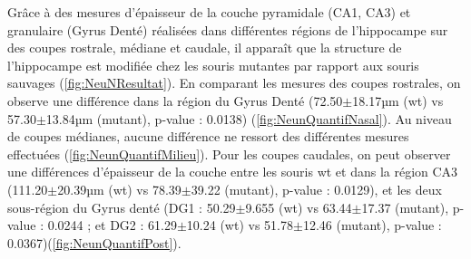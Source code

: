 		Grâce à des mesures d'épaisseur de la couche pyramidale (CA1, CA3) et granulaire (Gyrus Denté) réalisées dans différentes régions de l'hippocampe sur des coupes rostrale, médiane et caudale, il apparaît que la structure de l'hippocampe est modifiée chez les souris mutantes par rapport aux souris sauvages (\cref{fig:NeuNResultat}). En comparant les mesures des coupes rostrales, on observe une différence dans la région du Gyrus Denté (72.50$\pm$18.17µm (\acrshort{wt}) vs 57.30$\pm$13.84µm (mutant), p-value : 0.0138) (\cref{fig:NeunQuantifNasal}).  Au niveau de coupes médianes, aucune différence ne ressort des différentes mesures effectuées (\cref{fig:NeunQuantifMilieu}). Pour les coupes caudales, on peut observer une différences d'épaisseur de la couche entre les souris \gls{wt} et \mcrd dans la région CA3 (111.20$\pm$20.39µm (\acrshort{wt}) vs 78.39$\pm$39.22 (mutant), p-value : 0.0129), et les deux sous-région du Gyrus denté (DG1 : 50.29$\pm$9.655 (\acrshort{wt}) vs 63.44$\pm$17.37 (mutant), p-value : 0.0244 ; et DG2 : 61.29$\pm$10.24 (\acrshort{wt}) vs 51.78$\pm$12.46 (mutant), p-value : 0.0367)(\cref{fig:NeunQuantifPost}).
		
